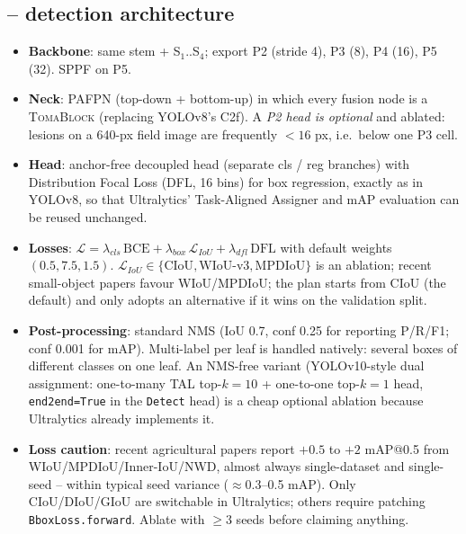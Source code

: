 \subsection{\modeldet{} -- detection architecture}
\begin{itemize}
  \item \textbf{Backbone}: same stem + S$_1$..S$_4$; export P2 (stride 4), P3 (8), P4 (16), P5 (32). SPPF on P5.
  \item \textbf{Neck}: PAFPN (top-down + bottom-up) in which every fusion node is a \textsc{TomaBlock} (replacing YOLOv8's C2f). A \emph{P2 head is optional} and ablated: lesions on a 640-px field image are frequently $<16$ px, i.e.\ below one P3 cell.
  \item \textbf{Head}: anchor-free decoupled head (separate cls / reg branches) with Distribution Focal Loss (DFL, 16 bins) for box regression, exactly as in YOLOv8, so that Ultralytics' Task-Aligned Assigner and mAP evaluation can be reused unchanged.
  \item \textbf{Losses}: $\mathcal{L} = \lambda_{cls}\,\mathrm{BCE} + \lambda_{box}\,\mathcal{L}_{IoU} + \lambda_{dfl}\,\mathrm{DFL}$ with default weights $(0.5, 7.5, 1.5)$. $\mathcal{L}_{IoU}\in\{\text{CIoU},\text{WIoU-v3},\text{MPDIoU}\}$ is an ablation; recent small-object papers favour WIoU/MPDIoU; the plan starts from CIoU (the default) and only adopts an alternative if it wins on the validation split.
  \item \textbf{Post-processing}: standard NMS (IoU 0.7, conf 0.25 for reporting P/R/F1; conf 0.001 for mAP). Multi-label per leaf is handled natively: several boxes of different classes on one leaf. An NMS-free variant (YOLOv10-style dual assignment: one-to-many TAL top-$k{=}10$ + one-to-one top-$k{=}1$ head, \texttt{end2end=True} in the \texttt{Detect} head) is a cheap optional ablation because Ultralytics already implements it.
  \item \textbf{Loss caution}: recent agricultural papers report $+0.5$ to $+2$ mAP@0.5 from WIoU/MPDIoU/Inner-IoU/NWD, almost always single-dataset and single-seed -- within typical seed variance ($\approx$0.3--0.5 mAP). Only CIoU/DIoU/GIoU are switchable in Ultralytics; others require patching \texttt{BboxLoss.forward}. Ablate with $\ge3$ seeds before claiming anything.
\end{itemize}

